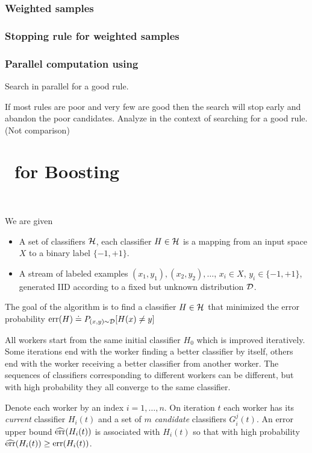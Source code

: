 \subsubsection*{Weighted samples}

\subsubsection*{Stopping rule for weighted samples}

\subsubsection*{Parallel computation using \tmsn}

Search in parallel for a good rule.

If most rules are poor and very few are good then the search will stop
early and abandon the poor candidates. Analyze in the context of
searching for a good rule. (Not comparison)

\section{\tmsn\ for Boosting}~\label{sec:boost}

We are given
\newcommand{\cD}{{\cal D}}
\begin{itemize}
\item A set of classifiers ${\cal H}$, each classifier $H \in
  {\cal H}$ is a mapping from an input space $X$ to a binary label $\{-1,+1\}$.
\item A stream of labeled examples $(x_1,y_1),(x_2,y_2),\ldots$, $x_i
  \in X$, $y_i \in \{-1,+1\}$, generated IID according to a fixed but
  unknown distribution $\cD$.
\end{itemize}

The goal of the algorithm is to find a classifier $H \in
{\cal H}$ that minimized the error probability $\err(H)\doteq
P_{(x,y) \sim \cD}[H(x) \neq y]$

All workers start from the same initial classifier $H_0$ which is
improved iteratively. Some iterations end with the worker finding a
better classifier by itself, others end with the worker receiving a
better classifier from another worker. The sequences of classifiers
corresponding to different workers can be different, but with high
probability they all converge to the same classifier.

Denote each worker by an index $i=1,\ldots,n$. On iteration $t$
each worker has its {\em current} classifier  $H_i(t)$ and a set of $m$
{\em candidate} classifiers $G_i^j(t)$. An error upper bound
$\widehat{\mbox{err}}(H_i(t))$ is associated with $H_i(t)$ so that with high
probability $\widehat{\mbox{err}}(H_i(t)) \geq \mbox{err}(H_i(t))$.

